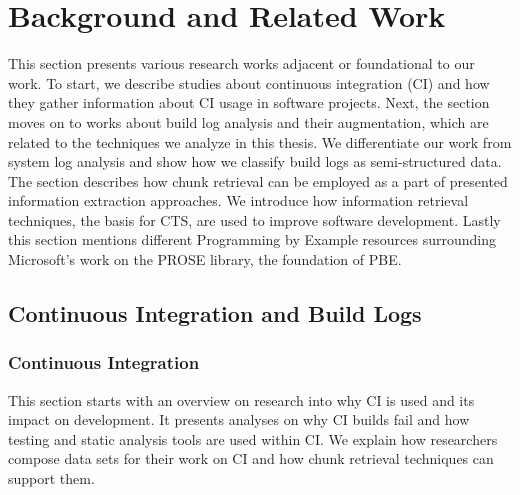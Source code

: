 \documentclass[\myrootdir/main.tex]{subfiles}
\begin{document}
\chapter{Background and Related Work}
\label{sec:rw}
This section presents various research works adjacent or foundational to our work.
To start, we describe studies about continuous integration (CI) and how they gather information about CI usage in software projects.
Next, the section moves on to works about build log analysis and their augmentation, which are related to the techniques we analyze in this thesis.
We differentiate our work from system log analysis and show how we classify build logs as semi-structured data.
The section describes how chunk retrieval can be employed as a part of presented information extraction approaches.
We introduce how information retrieval techniques, the basis for CTS, are used to improve software development.
Lastly this section mentions different Programming by Example resources surrounding Microsoft's work on the PROSE library, the foundation of PBE\@.

\section{Continuous Integration and Build Logs}
\subsection{Continuous Integration}
This section starts with an overview on research into why CI is used and its impact on development.
It presents analyses on why CI builds fail and how testing and static analysis tools are used within CI\@.
We explain how researchers compose data sets for their work on CI and how chunk retrieval techniques can support them.
\end{document}
